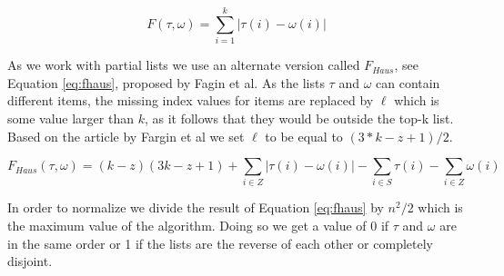 \begin{equation}\label{eq:sfd}
F(\tau, \omega) = \sum_{i=1}^{k} | \tau (i) - \omega (i) |
\end{equation}

As we work with partial lists we use an alternate version called $F_{Haus}$, see Equation \ref{eq:fhaus}, proposed by Fagin et al\citep{comparing:topk}.
As the lists $\tau$ and $\omega$ can contain different items, the missing index values for items are replaced by $\ell$ which is some value larger than $k$, as it follows that they would be outside the top-k list. Based on the article by Fargin et al we set $\ell$ to be equal to $(3 * k - z + 1)/2$.

\footnotesize
\begin{equation}\label{eq:fhaus}
F_{Haus}(\tau,\omega)= (k-z)(3k-z+1)+\sum_{i\in Z} | \tau (i) - \omega (i) | - \sum_{i\in S} \tau (i) - \sum_{i\in Z} \omega(i)
\end{equation}
\normalsize

In order to normalize we divide the result of Equation \ref{eq:fhaus} by $n^2 /2$ which is the maximum value of the algorithm. Doing so we get a value of 0 if $\tau$ and $\omega$ are in the same order or 1 if the lists are the reverse of each other or completely disjoint.
